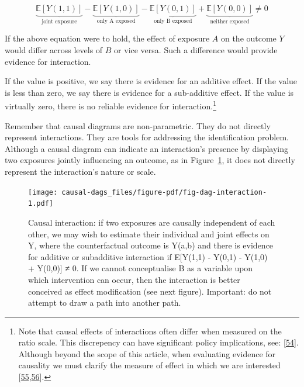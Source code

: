 \documentclass[
  singlecolumn]{article}
\begin{document}
\[ \underbrace{\mathbb{E}[Y(1,1)]}_{\text{joint exposure}} - \underbrace{\mathbb{E}[Y(1,0)]}_{\text{only A exposed}} - \underbrace{\mathbb{E}[Y(0,1)]}_{\text{only B exposed}} + \underbrace{\mathbb{E}[Y(0,0)]}_{\text{neither exposed}} \neq 0 \]

If the above equation were to hold, the effect of exposure \(A\) on the
outcome \(Y\) would differ across levels of \(B\) or vice versa. Such a
difference would provide evidence for interaction.

If the value is positive, we say there is evidence for an additive
effect. If the value is less than zero, we say there is evidence for a
sub-additive effect. If the value is virtually zero, there is no
reliable evidence for interaction.\footnote{Note that causal effects of
  interactions often differ when measured on the ratio scale. This
  discrepency can have significant policy implications, see:
  {[}\protect\hyperlink{ref-vanderweele2014}{54}{]}. Although beyond the
  scope of this article, when evaluating evidence for causality we must
  clarify the measure of effect in which we are interested
  {[}\protect\hyperlink{ref-hernuxe1n2004}{55},\protect\hyperlink{ref-tripepi2007}{56}{]}.}

Remember that causal diagrams are non-parametric. They do not directly
represent interactions. They are tools for addressing the identification
problem. Although a causal diagram can indicate an interaction's
presence by displaying two exposures jointly influencing an outcome, as
in Figure~\ref{fig-dag-interaction}, it does not directly represent the
interaction's nature or scale.

\begin{figure}

{\centering \texttt{[image: causal-dags\_files/figure-pdf/fig-dag-interaction-1.pdf]}

}

\caption{\label{fig-dag-interaction}Causal interaction: if two exposures
are causally independent of each other, we may wish to estimate their
individual and joint effects on Y, where the counterfactual outcome is
Y(a,b) and there is evidence for additive or subadditive interaction if
E{[}Y(1,1) - Y(0,1) - Y(1,0) + Y(0,0){]} ≠ 0. If we cannot conceptualise
B as a variable upon which intervention can occur, then the interaction
is better conceived as effect modification (see next figure). Important:
do not attempt to draw a path into another path.}

\end{figure}
\end{document}
